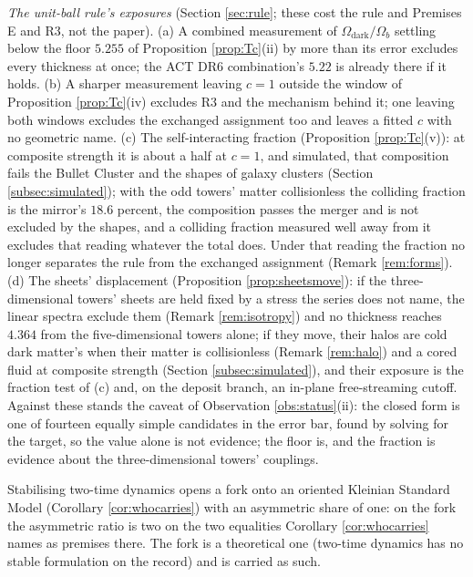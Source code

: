 \documentclass[11pt]{article}
\theoremstyle{definition}
\begin{document}
\emph{The unit-ball rule's exposures} (Section \ref{sec:rule}; these cost the rule and Premises E and R3, not the paper). (a) A combined measurement of $\Omega_{\mathrm{dark}}/\Omega_{b}$ settling below the floor $5.255$ of Proposition \ref{prop:Tc}(ii) by more than its error excludes every thickness at once; the ACT DR6 combination's $5.22$ is already there if it holds. (b) A sharper measurement leaving $c = 1$ outside the window of Proposition \ref{prop:Tc}(iv) excludes R3 and the mechanism behind it; one leaving both windows excludes the exchanged assignment too and leaves a fitted $c$ with no geometric name. (c) The self-interacting fraction (Proposition \ref{prop:Tc}(v)): at composite strength it is about a half at $c = 1$, and simulated, that composition fails the Bullet Cluster and the shapes of galaxy clusters (Section \ref{subsec:simulated}); with the odd towers' matter collisionless the colliding fraction is the mirror's $18.6$ percent, the composition passes the merger and is not excluded by the shapes, and a colliding fraction measured well away from it excludes that reading whatever the total does. Under that reading the fraction no longer separates the rule from the exchanged assignment (Remark \ref{rem:forms}). (d) The sheets' displacement (Proposition \ref{prop:sheetsmove}): if the three-dimensional towers' sheets are held fixed by a stress the series does not name, the linear spectra exclude them (Remark \ref{rem:isotropy}) and no thickness reaches $4.364$ from the five-dimensional towers alone; if they move, their halos are cold dark matter's when their matter is collisionless (Remark \ref{rem:halo}) and a cored fluid at composite strength (Section \ref{subsec:simulated}), and their exposure is the fraction test of (c) and, on the deposit branch, an in-plane free-streaming cutoff. Against these stands the caveat of Observation \ref{obs:status}(ii): the closed form is one of fourteen equally simple candidates in the error bar, found by solving for the target, so the value alone is not evidence; the floor is, and the fraction is evidence about the three-dimensional towers' couplings.

Stabilising two-time dynamics opens a fork onto an oriented Kleinian Standard Model (Corollary \ref{cor:whocarries}) with an asymmetric share of one: on the fork the asymmetric ratio is two on the two equalities Corollary \ref{cor:whocarries} names as premises there. The fork is a theoretical one (two-time dynamics has no stable formulation on the record) and is carried as such.
\end{document}

